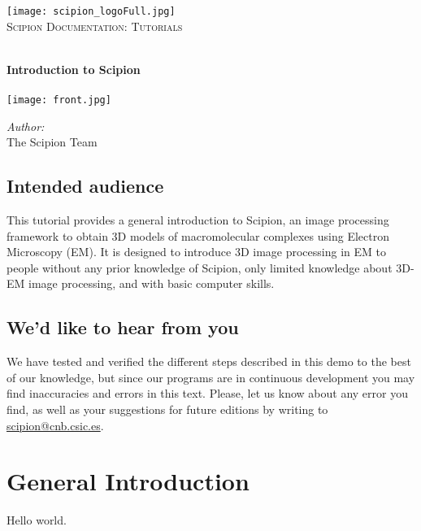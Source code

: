 \documentclass{scrartcl}
\begin{document}
\begin{titlepage}

\texttt{[image: scipion\_logoFull.jpg]}\\[1.5cm]


\textsc{\Large Scipion Documentation: Tutorials}

\HRule \\[0.4cm]
{\huge \bfseries Introduction to Scipion}\\[0.4cm]
\HRule \\[1.5cm]

\texttt{[image: front.jpg]}

\begin{flushright}
\large
\emph{Author:}\\
The Scipion Team %
\end{flushright}

\end{titlepage}

\tableofcontents

\newpage


\subsection*{Intended audience}

This tutorial provides a general introduction to Scipion, an image
processing framework to obtain 3D models of macromolecular complexes
using Electron Microscopy (EM). It is designed to introduce 3D image
processing in EM to people without any prior knowledge of Scipion,
only limited knowledge about 3D-EM image processing, and with basic
computer skills.

\subsection*{We'd like to hear from you}

We have tested and verified the different steps described in this demo
to the best of our knowledge, but since our programs are in continuous
development you may find inaccuracies and errors in this text. Please,
let us know about any error you find, as well as your suggestions for
future editions by writing to
\href{mailto:scipion@cnb.csic.es}{scipion@cnb.csic.es}.

\newpage


\section{General Introduction}

Hello world.
\end{document}
